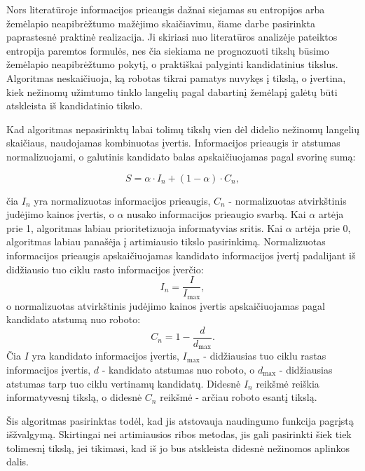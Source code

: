 \documentclass[]{VUMIFTemplateClass}
\begin{document}
Nors literatūroje informacijos prieaugis dažnai siejamas su entropijos arba žemėlapio neapibrėžtumo mažėjimo skaičiavimu, šiame darbe pasirinkta paprastesnė
praktinė realizacija. Ji skiriasi nuo literatūros analizėje pateiktos entropija paremtos formulės, nes čia siekiama ne prognozuoti tikslų būsimo žemėlapio
neapibrėžtumo pokytį, o praktiškai palyginti kandidatinius tikslus. Algoritmas neskaičiuoja, ką robotas tikrai pamatys nuvykęs į tikslą, o įvertina, kiek
nežinomų užimtumo tinklo langelių pagal dabartinį žemėlapį galėtų būti atskleista iš kandidatinio tikslo.

Kad algoritmas nepasirinktų labai tolimų tikslų vien dėl didelio nežinomų langelių skaičiaus, naudojamas kombinuotas įvertis. Informacijos prieaugis ir
atstumas normalizuojami, o galutinis kandidato balas apskaičiuojamas pagal svorinę sumą:

\begin{equation}
S = \alpha \cdot I_n + (1 - \alpha) \cdot C_n,
\end{equation}

čia $I_n$ yra normalizuotas informacijos prieaugis, $C_n$ - normalizuotas atvirkštinis judėjimo kainos įvertis, o $\alpha$ nusako informacijos prieaugio
svarbą. Kai $\alpha$ artėja prie 1, algoritmas labiau prioritetizuoja informatyvias sritis. Kai $\alpha$ artėja prie 0, algoritmas labiau panašėja į
artimiausio tikslo pasirinkimą.
Normalizuotas informacijos prieaugis apskaičiuojamas kandidato informacijos įvertį padalijant iš didžiausio tuo ciklu rasto informacijos įverčio:
\begin{equation}
I_n = \frac{I}{I_{\max}},
\end{equation}
o normalizuotas atvirkštinis judėjimo kainos įvertis apskaičiuojamas pagal kandidato atstumą nuo roboto:
\begin{equation}
C_n = 1 - \frac{d}{d_{\max}}.
\end{equation}
Čia $I$ yra kandidato informacijos įvertis, $I_{\max}$ - didžiausias tuo ciklu rastas informacijos įvertis, $d$ - kandidato atstumas nuo roboto, o $d_{\max}$ -
didžiausias atstumas tarp tuo ciklu vertinamų kandidatų. Didesnė $I_n$ reikšmė reiškia informatyvesnį tikslą, o didesnė $C_n$ reikšmė - arčiau roboto esantį
tikslą.

Šis algoritmas pasirinktas todėl, kad jis atstovauja naudingumo funkcija pagrįstą išžvalgymą. Skirtingai nei artimiausios ribos metodas, jis gali pasirinkti
šiek tiek tolimesnį tikslą, jei tikimasi, kad iš jo bus atskleista didesnė nežinomos aplinkos dalis.
\end{document}
